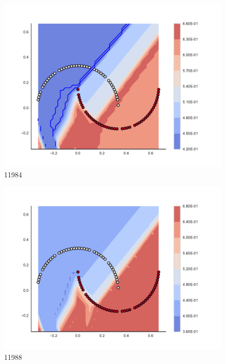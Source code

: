 \begin{subfigure}[b]{0.09\textwidth}
    \includegraphics[clip, trim=2.35cm 1.75cm 4.5cm 0cm,width=\textwidth]{img/convergence/11984.pdf}
    \caption{11984}
    \label{fig:convergence_11984}
\end{subfigure}
%
\begin{subfigure}[b]{0.09\textwidth}
    \includegraphics[clip, trim=2.35cm 1.75cm 4.5cm 0cm,width=\textwidth]{img/convergence/11988.pdf}
    \caption{11988}
    \label{fig:convergence_11988}
\end{subfigure}
%

